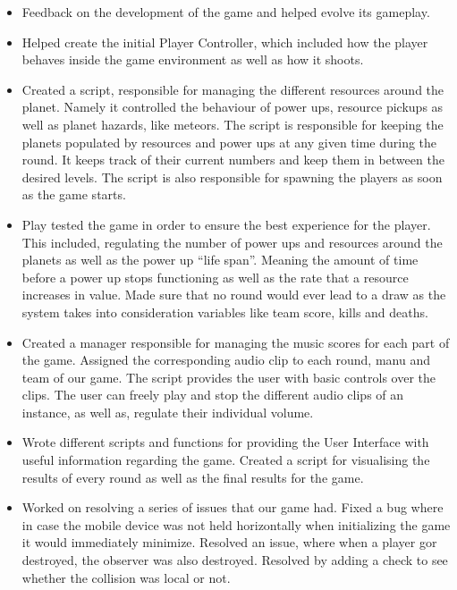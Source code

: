 \documentclass[11pt,a4paper]{article}
\begin{document}
        \begin{itemize}
          \item Feedback on the development of the game and helped evolve its gameplay.
           
          \item Helped create the initial Player Controller, which included how the player behaves inside the game environment as well as how it shoots.  

          \item Created a script, responsible for managing the different resources around the planet. Namely it controlled the behaviour of power ups, resource pickups as well as planet hazards, like meteors. The script is responsible for keeping the planets populated by resources and power ups at any given time during the round. It keeps track of their current numbers and keep them in between the desired levels. The script is also responsible for spawning the players as soon as the game starts.

          \item Play tested the game in order to ensure the best experience for the player. This included, regulating the number of power ups and resources around the planets as well as the power up “life span”. Meaning the amount of time before a power up stops functioning as well as the rate that a resource increases in value. Made sure that no round would ever lead to a draw as the system takes into consideration variables like team score, kills and deaths.

          \item Created a manager responsible for managing the music scores for each part of the game. Assigned the corresponding audio clip to each round, manu and team of our game. The script provides the user with basic controls over the clips. The user can freely play and stop the different audio clips of an instance, as well as, regulate their individual volume.

          \item Wrote different scripts and functions for providing the User Interface with useful information regarding the game. Created a script for visualising the results of every round as well as the final results for the game. 

          \item Worked on resolving a series of issues that our game had. Fixed a bug where in case the mobile device was not held horizontally when initializing the game it would immediately minimize. Resolved an issue, where when a player gor destroyed, the observer was also destroyed. Resolved by adding a check to see whether the collision was local or not.
        \end{itemize}
\end{document}
